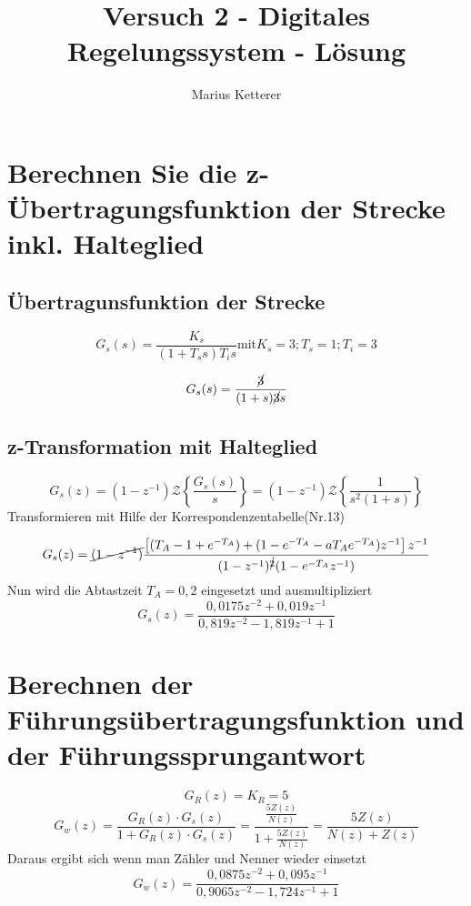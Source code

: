 \documentclass[12pt,a4paper]{article}
\author{Marius Ketterer}
\title{Versuch 2 - Digitales Regelungssystem - Lösung}
\begin{document}
		\maketitle
	\tableofcontents

	
	\newpage
	\section{Berechnen Sie die z-Übertragungsfunktion der Strecke inkl. Halteglied}
	
	\subsection{Übertragunsfunktion der Strecke}
	\begin{equation}
	G_s(s) = \frac{K_s}{(1+T_ss)T_is} \text{mit} K_s = 3;T_s = 1;T_i = 3
	\end{equation}
	
	\begin{equation}
	G_s(s) = \frac{\cancel{3}}{(1+s)\cancel{3}s}
	\end{equation}
	\subsection{z-Transformation mit Halteglied}
	\begin{equation}
	G_s(z) = (1-z^{-1}) 
	\mathcal{Z}
	\left\{
		\frac{G_s(s)}{s}
	\right\} =
	(1-z^{-1}) 
	\mathcal{Z}
	\left\{
		\frac{1}{s^2(1+s)}
	\right\} 
	\end{equation}
	Transformieren mit Hilfe der Korrespondenzentabelle(Nr.13)
	
	\begin{equation}
	G_s(z) = \cancel{(1-z^{-1})} 
	\frac{\left[(T_A-1+e^{-T_A})+(1-e^{-T_A}-aT_Ae^{-T_A})z^{-1}\right]z^{-1}}
	{(1-z^{-1})^{\cancel{2}}(1-e^{-T_A}z^{-1})}
	\end{equation}
	Nun wird die Abtastzeit $T_A=0,2$ eingesetzt und ausmultipliziert
	\begin{equation}
	G_s(z)= \frac
	{0,0175z^{-2}+0,019z^{-1}}
	{0,819z^{-2}-1,819z^{-1}+1}
	\end{equation}
	\section{Berechnen der Führungsübertragungsfunktion und der Führungssprungantwort}
	\begin{equation}
	G_R(z)= K_R =5
	\end{equation}
	\begin{equation}
	G_w(z)=\frac{G_R(z)\cdot G_s(z)}{1+G_R(z)\cdot G_s(z)} = 
	\frac{\frac{5Z(z)}{N(z)}}{1+\frac{5Z(z)}{N(z)}} = \frac{5Z(z)}{N(z)+Z(z)}
	\end{equation}
	Daraus ergibt sich wenn man Zähler und Nenner wieder einsetzt
	\begin{equation}
	G_w(z)= \frac
	{0,0875z^{-2}+0,095z^{-1}}
	{0,9065z^{-2}-1,724z^{-1}+1}
	\end{equation}
	
\end{document}
